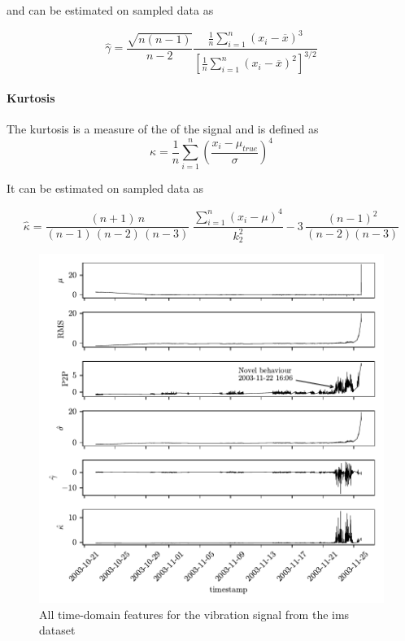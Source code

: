 and can be estimated on sampled data as

\begin{equation}
  \hat{\gamma} = \frac{\sqrt{n(n-1)}}{n-2} \frac{\tfrac{1}{n} \sum_{i=1}^n (x_i-\overline{x})^3}{\left[\tfrac{1}{n} \sum_{i=1}^n (x_i-\overline{x})^2 \right]^{3/2}}
\end{equation}

\paragraph{Kurtosis}
The kurtosis is a measure of the  of the signal and is defined as
\begin{equation}
    \kappa = \frac{1}{n}\sum_{i=1}^n \left(\frac{x_i - \mu_{true}}{\sigma}\right)^4
\end{equation}

It can be estimated on sampled data as

\begin{equation}
  \hat{\kappa} = \frac{(n+1)\,n}{(n-1)\,(n-2)\,(n-3)} \; \frac{\sum_{i=1}^n (x_i - \mu)^4}{k_2^2} - 3\,\frac{(n-1)^2}{(n-2) (n-3)}
\end{equation}

\begin{figure}
    \centering
    \includegraphics[scale=1]{images/FeatureExtraction/TDfeatures.pdf}
    \caption{All time-domain features for the  vibration signal from the \gls{ims} dataset}
    \label{fig:IMS_TD_features}
\end{figure}

